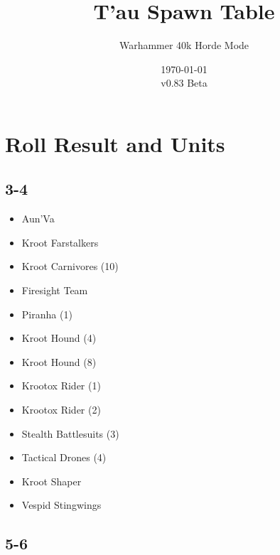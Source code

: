 \documentclass{HordeModeTarot}
\title{T'au Spawn Table}
\author{Warhammer 40k Horde Mode}
\date{\today \\v0.83 Beta}
\begin{document}
\maketitle

\outputUsingSpawnTableBoilerplate
\section{Roll Result and Units}\hypertarget{roll-results}{}\label{roll-results}

\begin{multicols}{2}

\subsection*{3-4}

\begin{itemize}[leftmargin=*]
\item[] Aun'Va
\item[] Kroot Farstalkers
\item[] Kroot Carnivores (10)
\item[] Firesight Team
\item[] Piranha (1)
\item[] Kroot Hound (4)
\item[] Kroot Hound (8)
\item[] Krootox Rider (1)
\item[] Krootox Rider (2)
\item[] Stealth Battlesuits (3)
\item[] Tactical Drones (4)
\item[] Kroot Shaper
\item[] Vespid Stingwings
\end{itemize}

\subsection*{5-6}


\end{multicols}
\end{document}
